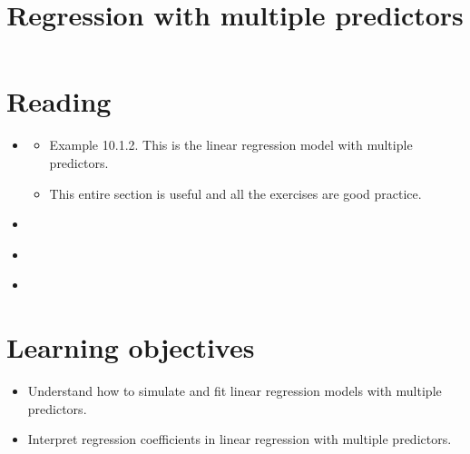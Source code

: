 




\title{Regression with multiple predictors}
\maketitle
\section{Reading}
\begin{itemize}
\item  \cite[Section 10.1]{islp}
\begin{itemize}
\item Example 10.1.2. This is the linear regression model with multiple predictors. 
\item This entire section is useful and all the exercises are good practice. 
\end{itemize}
\item \cite[Section 10.2]{tabak}
\item \cite[Section 10.5]{tabak}
\item \cite[Section 3.2]{islp}
\end{itemize}

\section{Learning objectives}

\begin{itemize}
\item Understand how to simulate and fit linear regression models with multiple predictors. 
\item Interpret regression coefficients in linear regression with multiple predictors. 
\end{itemize}


